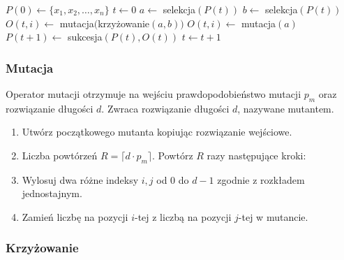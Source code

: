\documentclass[12pt, a4paper]{article}
\begin{document}
\begin{algorithm}[!htb]
\label{ea}
\begin{algorithmic}[1]
  \State $P(0) \gets \{x_1, x_2, \ldots, x_n\}$
  \State $t \gets 0$
      \State $a \gets$ selekcja$(P(t))$
	\State $b \gets$ selekcja$(P(t))$
	\State $O(t,i) \gets$ mutacja$($krzy{\.z}owanie$(a, b))$
      \Else
	\State $O(t,i) \gets$ mutacja$(a)$
      \EndIf
    \EndFor
    \State $P(t+1) \gets$ sukcesja$(P(t),O(t))$
    \State $t \gets t+1$
  \EndWhile
\EndFunction
\end{algorithmic}
\end{algorithm}

\subsubsection{Mutacja}

Operator mutacji otrzymuje na wejściu prawdopodobieństwo mutacji $p_m$ oraz rozwiązanie długości $d$.
Zwraca rozwiązanie długości $d$, nazywane mutantem.

\begin{enumerate}
 \item Utwórz początkowego mutanta kopiując rozwiązanie wejściowe.
 \item Liczba powtórzeń $R = \lceil d \cdot  p_m \rceil$. Powtórz $R$ razy następujące kroki:
 \item Wylosuj dwa różne indeksy $i, j$ od 0 do $d-1$ zgodnie z rozkładem jednostajnym.
 \item Zamień liczbę na pozycji $i$-tej z liczbą na pozycji $j$-tej w mutancie.
\end{enumerate}

\subsubsection{Krzyżowanie}
\end{document}
